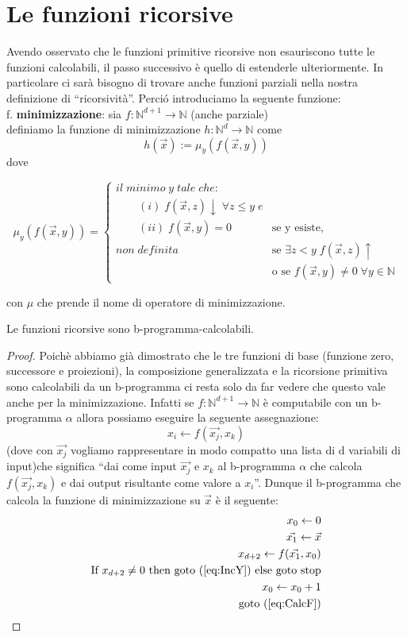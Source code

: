 \section{Le funzioni ricorsive}
Avendo osservato che le funzioni primitive ricorsive non
esauriscono tutte le funzioni calcolabili, il passo successivo \`e  quello di
estenderle ulteriormente. In particolare ci sar\`a bisogno di trovare
anche funzioni parziali nella nostra definizione di ``ricorsivit\`a''. Perci\'o
introduciamo
la seguente funzione: \\

f. \textbf{minimizzazione}: sia $f: \mathbb{N}^{d+1} \to \mathbb{N}$ (anche
parziale)\\
definiamo la funzione di minimizzazione $h: \mathbb{N}^{d} \to \mathbb{N}$ come
$$ h(\vec{x}):= \mu_{y}(f(\vec{x},y)) $$
dove

\[\mu_{y}(f(\vec{x},y)) = 
\begin{cases}
il \; minimo \; y \; tale \; che: \\
\qquad (i) \; f(\vec{x},z)\downarrow \; \forall z \leq y \; e \\
\qquad (ii) \; f(\vec{x},y)=0 & \text{se y esiste,} \\
non \; definita \; & \text{se $\exists z < y \; f(\vec{x},z) \uparrow$}\\
 & \text{o se $f(\vec{x},y)\neq 0 \; \forall y \in \mathbb{N} $}
\end{cases} \]

con $\mu$ che prende il nome di operatore di minimizzazione.
\begin{teorema} Le funzioni ricorsive sono b-programma-calcolabili.
\end{teorema}
\begin{proof} Poich\`e abbiamo gi\`a dimostrato che le tre funzioni di base
(funzione zero, successore e proiezioni), la composizione generalizzata e la
ricorsione primitiva sono calcolabili da un b-programma ci resta solo da far
vedere che questo vale anche per la minimizzazione. Infatti se
$f:\mathbb{N}^{d+1} \to \mathbb{N}$ \`e computabile con un b-programma $\alpha$
allora possiamo eseguire la seguente assegnazione:
\[ x_i \leftarrow f(\vec{x_{j}}, x_k) \]
(dove con $\vec{x_{j}}$ vogliamo rappresentare in modo compatto una lista di d
variabili di input)che significa "`dai come input $\vec{x_{j}}$ e $x_k$ al
b-programma $\alpha$ che calcola $f(\vec{x_{j}}, x_k)$ e dai output risultante
come valore a $x_i$"'. Dunque il b-programma che calcola la funzione di
minimizzazione su $\vec{x}$ \`e il seguente:\\
   \begin{eqnarray}
       x_0 \leftarrow 0 \\
       \vec{x_{1}} \leftarrow \vec{x}  \label{eq:CalcF}\\
       x_{d+2} \leftarrow f(\vec{x_{1}}, x_0) \\
       \textrm{If } x_{d+2} \neq 0 \
       \textrm{then goto}\ (\ref{eq:IncY})\ \textrm{else goto stop}\\
       x_0 \leftarrow x_0 + 1 \label{eq:IncY}\\
       \textrm{goto}\ (\ref{eq:CalcF})       
  \end{eqnarray}
\end{proof}

